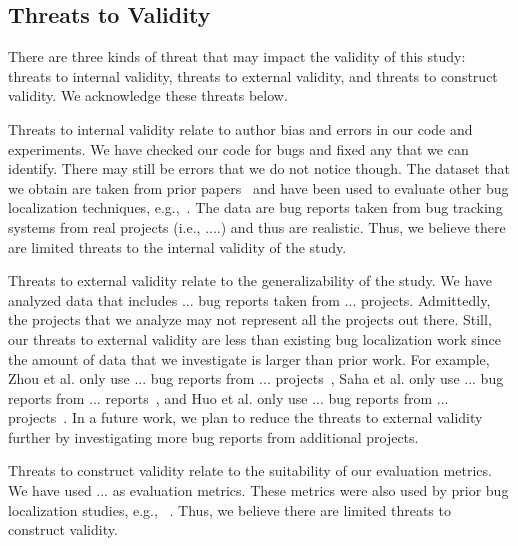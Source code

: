 \subsection{Threats to Validity}


There are three kinds of threat that may impact the validity of this study: threats to internal validity, threats to external validity, and threats to construct validity. We acknowledge these threats below.

Threats to internal validity relate to author bias and errors in our code and experiments. We have checked our code for bugs and fixed any that we can identify. There may still be errors that we do not notice though. The dataset that we obtain are taken from prior papers~\cite{zhou2012should,KochharTL14} and have been used to evaluate other bug localization techniques, e.g.,~\cite{zhou2012should,SahaLKP14,huo2016learning}. The data are bug reports taken from bug tracking systems from real projects (i.e., ....) and thus are realistic. Thus, we believe there are limited threats to the internal validity of the study. 

Threats to external validity relate to the generalizability of the study. We have analyzed data that includes ... bug reports taken from ... projects. Admittedly, the projects that we analyze may not represent all the projects out there. Still, our threats to external validity are less than existing bug localization work since the amount of data that we investigate is larger than prior work. For example, Zhou et al. only use ... bug reports from ... projects~\cite{zhou2012should}, Saha et al. only use ... bug reports from ... reports~\cite{SahaLKP14}, and Huo et al. only use ... bug reports from ... projects~\cite{huo2016learning}. In a future work, we plan to reduce the threats to external validity further by investigating more bug reports from additional projects.

Threats to construct validity relate to the suitability of our evaluation metrics. We have used ... as evaluation metrics. These metrics were also used by prior bug localization studies, e.g.,  ~\cite{zhou2012should,SahaLKP14,huo2016learning}. Thus, we believe there are limited threats to construct validity. 